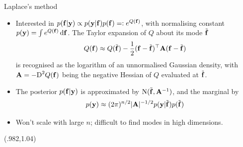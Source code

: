 \begin{frame}[label=laplace]{Laplace's method}
  \vspace{-15pt}
  \begin{itemize}[<+->]\setlength\itemsep{0.8em}
    \item Interested in $p({\mathbf f}|{\mathbf y}) \propto p({\mathbf y}|{\mathbf f})p({\mathbf f}) =: e^{Q({\mathbf f})}$, with normalising constant $p({\mathbf y}) = \int e^{Q({\mathbf f})} \, \text{d}{\mathbf f}$. The Taylor expansion of $Q$ about its mode $\tilde{{\mathbf f}}$
    \[
      Q({\mathbf f}) \approx Q(\tilde{{\mathbf f}}) - \frac{1}{2} ({\mathbf f} - \tilde{{\mathbf f}})^\top{\mathbf A}({\mathbf f} - \tilde{{\mathbf f}}) 
    \]
    is recognised as the logarithm of an unnormalised Gaussian density, with ${\mathbf A} = -\text{D}^2 Q({\mathbf f})$ being the negative Hessian of $Q$ evaluated at  $\tilde{{\mathbf f}}$.
    \item The posterior $p({\mathbf f}|{\mathbf y})$ is approximated by $\operatorname{N}(\tilde{{\mathbf f}}, {\mathbf A}^{-1})$, and the marginal by
    \[
      p({\mathbf y}) \approx (2\pi)^{n/2} \vert {\mathbf A} \vert^{-1/2}  p({\mathbf y}|\tilde{{\mathbf f}})p(\tilde{{\mathbf f}})
    \]
    \item Won't scale with large $n$; difficult to find modes in high dimensions.
  \end{itemize}
  
  \begin{textblock*}{3cm}(.982\textwidth,1.04\textheight)%
    \hyperlink{quality}{}      
  \end{textblock*}
\end{frame}

